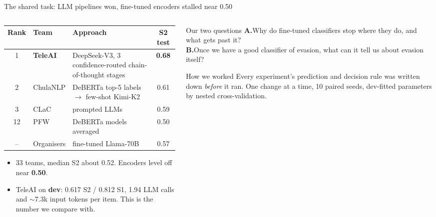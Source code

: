 \documentclass[aspectratio=169,10pt]{beamer}
\newcommand{\hl}[1]{\textcolor{accent}{\textbf{#1}}}
\begin{document}
\begin{frame}{The shared task: LLM pipelines won, fine-tuned encoders stalled near 0.50}
  \begin{columns}[T]
    \begin{column}{0.58\textwidth}
      \centering\footnotesize
      \renewcommand{\arraystretch}{1.12}\setlength{\tabcolsep}{4pt}
      \begin{tabular}{@{}c l >{\raggedright\arraybackslash}p{3.9cm} c@{}}
        \toprule
        \textbf{Rank} & \textbf{Team} & \textbf{Approach} & \textbf{S2} \hl{test} \\
        \midrule
        1  & \textbf{TeleAI} & DeepSeek-V3, 3 confidence-routed chain-of-thought stages & \textbf{0.68} \\
        2  & ChulaNLP & DeBERTa top-5 labels $\rightarrow$ few-shot Kimi-K2 & 0.61 \\
        3  & CLaC & prompted LLMs & 0.59 \\
        12 & PFW & 50 DeBERTa models averaged & 0.50 \\
        \midrule
        -- & Organisers & fine-tuned Llama-70B & 0.57 \\
        \bottomrule
      \end{tabular}\par\vspace{5pt}
      \raggedright\small
      \begin{itemize}
        \item 33 teams, median S2 about 0.52. Encoders level off near \hl{0.50}.
        \item TeleAI on \textbf{dev}: 0.617 S2 / 0.812 S1, 1.94 LLM calls and ${\sim}$7.3k input tokens per item. This is the
              number we compare with.
      \end{itemize}
    \end{column}
    \begin{column}{0.39\textwidth}
      \begin{block}{Our two questions}
        \small
        \textbf{A.}\enspace Why do fine-tuned classifiers stop where they do, and what gets past it?\\[6pt]
        \textbf{B.}\enspace Once we have a good classifier of evasion, what can it tell us about evasion itself?
      \end{block}
      \begin{block}{How we worked}
        \small
        Every experiment's prediction and decision rule was written down \emph{before} it ran. One change at a time,
        10 paired seeds, dev-fitted parameters by nested cross-validation.
      \end{block}
    \end{column}
  \end{columns}
\end{frame}
\end{document}
